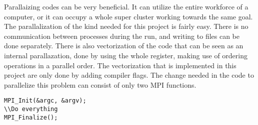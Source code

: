 %
Parallaizing codes can be very beneficial. It can utilize the entire workforce
of a computer, or it can occupy a whole super cluster working towards the same goal.
The parallalization of the kind needed for this project is fairly easy. 
There is no communication between processes during the run, and writing to files can be done separately. 
There is also vectorization of the code that can be seen as an internal parallazation, done by using the whole register, making use of ordering operations
in a parallel order. The vectorization that is implemented in this project are 
only done by adding compiler flags.
The change needed in the code to parallelize this problem can consist of only two MPI functions.
\begin{lstlisting}[linewidth=5.5cm,frame=single]
MPI_Init(&argc, &argv);
\\Do everything
MPI_Finalize();
\end{lstlisting}

%
